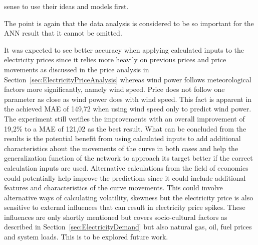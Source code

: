 sense to use their ideas and models first. 

The point is again that the data analysis is considered to be so important for the ANN result that it cannot be omitted. 



It was expected to see better accuracy when applying calculated inputs to the electricity prices since it relies more heavily on previous prices and price movements as discussed in the price analysis in Section~\ref{sec:ElectricityPriceAnalysis} whereas wind power follows meteorological factors more significantly, namely wind speed. Price does not follow one parameter as close as wind power does with wind speed. This fact is apparent in the achieved MAE of 149,72 when using wind speed only to predict wind power. The experiment still verifies the improvements with an overall improvement of 19,2\% to a MAE of 121,02 as the best result. What can be concluded from the results is the potential benefit from using calculated inputs to add additional characteristics about the movements of the curve in both cases and help the generalization function of the network to approach its target better if the correct calculation inputs are used. Alternative calculations from the field of economics could potentially help improve the predictions since it could include additional features and characteristics of the curve movements. This could involve alternative ways of calculating volatility, skewness but the electricity price is also sensitive to external influences that can result in electricity price spikes\cite{singhal2011electricity}. These influences are only shortly mentioned but covers socio-cultural factors as described in Section~\ref{sec:ElectricityDemand} but also natural gas, oil, fuel prices and system loads\cite{singhal2011electricity}. This is to be explored future work. 

